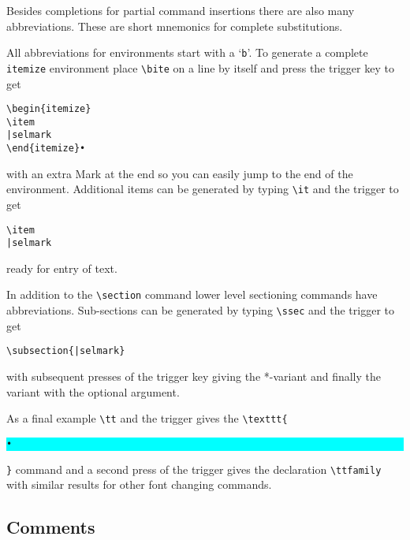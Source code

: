 \documentclass[11pt]{article}
\newcommand{\cmd}[1]{\texttt{#1}}
\newcommand{\selmark}{\colorbox{cyan}{\rule[-0.5ex]{0ex}{2.1ex}\texttt{•}}}
\begin{document}
Besides completions for partial command insertions there are also many abbreviations. These are short mnemonics for complete substitutions. 

All abbreviations for environments start with a `\texttt{b}'. To generate a complete \cmd{itemize} environment place \verb|\bite| on a line by itself and press the trigger key to get
\begin{verbatim}
\begin{itemize}
\item
|selmark
\end{itemize}•
\end{verbatim}
with an extra Mark at the end so you can easily jump to the end of the environment. Additional items can be generated by typing \verb|\it| and the trigger to get
\begin{verbatim}
\item
|selmark
\end{verbatim}
ready for entry of text.

In addition to the \verb|\section| command lower level sectioning commands have abbreviations. Sub-sections can be generated by typing \verb|\ssec| and the trigger to get
\begin{verbatim}
\subsection{|selmark}
\end{verbatim}
with subsequent presses of the trigger key giving the *-variant and finally the variant with the optional argument.

As a final example \verb|\tt| and the trigger gives the \verb|\texttt{|\selmark\verb|}| command and a second press of the trigger gives the declaration \verb|\ttfamily| with similar results for other font changing commands.

\subsection*{Comments}
\end{document}
